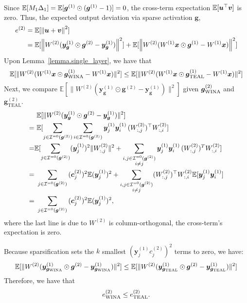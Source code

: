 Since $\E[M_1\Delta_1]=\E[\bm{g}^{(1)}\odot(\bm{g}^{(1)}-1)]=0$, the cross-term expectation $\E[\bm{u}^\top\bm{v}]$ is zero. Thus, the expected output deviation via sparse activation $\bm{g}$,
\begin{equation}
	\begin{split}
		e^{(2)}&=\E[\norm{\bm{u}+\bm{v}}^2]\\    
		&=\E[\norm{W^{(2)}{(\bm{y}_{\bm{g}}^{(1)} \odot \bm{g}^{(2)} - \bm{y}_{\bm{g}}^{(1)}})}^2] +\E[\norm{W^{(2)}(W^{(1)} \bm{x}\odot \bm{g}^{(1)} - W^{(1)} \bm{x})}^2]
	\end{split}
\end{equation}
Upon Lemma~\ref{lemma.single_layer}, we have that
$$
\mathbb{E}[\| W^{(2)}(W^{(1)} \bm{x}\odot \bm{g}_{\text{\algacro{}}}^{(1)} - W^{(1)} \bm{x}) \|^2] \leq \mathbb{E}[\| W^{(2)}(W^{(1)} \bm{x}\odot \bm{g}_{\text{TEAL}}^{(1)} - W^{(1)} \bm{x}) \|^2]
$$
Next, we compare $\mathbb{E}[\|W^{(2)}(\bm{y}_{\bm{g}}^{(1)} \odot \bm{g}^{(2)} - \bm{y}_{\bm{g}}^{(1)})\|^2]$ given $\bm{g}_\text{\algacro{}}^{(2)}$ and $\bm{g}_\text{TEAL}^{(2)}$.
\begin{align*}
	&\ \mathbb{E}[\|W^{(2)}(\bm{y}_{\bm{g}}^{(1)} \odot \bm{g}^{(2)} - \bm{y}_{\bm{g}}^{(1)})\|^2]\\
	=&\ \E[{\sum_{j\in \mathcal{I}^{=0}(\bm{g}^{(2)})}\sum_{i\in \mathcal{I}^{=0}(\bm{g}^{(2)})} \bm{y}_j^{(1)}\bm{y}_i^{(1)}\,(W_{:,j}^{(2)})^\top W_{:,i}^{(2)}}]\\
	= &\E[{\sum_{j\in \mathcal{I}^{=0}(\bm{g}^{(2)})} (\bm{y}_j^{(1)})^2\|W_{:,j}^{(2)}\|^2 + \sum_{\substack{i,j\in \mathcal{I}^{=0}(\bm{g}^{(2)})\\i\neq j}} \bm{y}_j^{(1)}\bm{y}_i^{(1)}\,(W_{:,j}^{(2)})^T W_{:,i}^{(2)}}]\\
	= &\ \sum_{j\in \mathcal{I}^{=0}(\bm{g}^{(2)})}{(\bm{c}_j^{(2)})^2\E{(\bm{y}_{j}^{(1)})^2}} + \sum_{\substack{i,j\in \mathcal{I}^{=0}(\bm{g}^{(2)})\\i\neq j}}({W_{:,j}^{(2)})^\top W_{:,i}^{(2)}\E[{\bm{y}_j^{(1)}\bm{y}_i^{(1)}}]}\\
	= &\ \sum_{j\in \mathcal{I}^{=0}(\bm{g}^{(2)})}{(\bm{c}_j^{(2)})^2\E{(\bm{y}_{j}^{(1)})^2}},
\end{align*}
where the last line is due to $W^{(2)}$ is column-orthogonal, the cross-term's expectation is zero.

Because \algacro{} sparsification sets the $k$ smallest $(\bm{y}_j^{(1)}c_j^{(2)})^2$ terms to zero, we have:
$$
\mathbb{E}[\|W^{(2)}(\bm{y}_{\bm{g}_\text{\algacro{}}}^{(1)} \odot \bm{g}^{(2)} - \bm{y}_{\bm{g}_\text{\algacro{}}}^{(1)})\|^2]\leq \mathbb{E}[\|W^{(2)}(\bm{y}_{\bm{g}_\text{TEAL}}^{(1)} \odot \bm{g}^{(2)} - \bm{y}_{\bm{g}_{\text{TEAL}}}^{(1)})\|^2]
$$
Therefore, we have that 
$$
e_{\text{\algacro{}}}^{(2)}\leq e_{\text{TEAL}}^{(2)}.
$$
